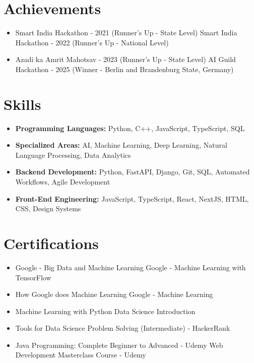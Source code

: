 \documentclass[a4paper,10pt]{article}
\begin{document}
\section*{Achievements}
\begin{itemize}
\item Smart India Hackathon - 2021 (Runner's Up - State Level) \hfill Smart India Hackathon - 2022 (Runner's Up - National Level)
\item Azadi ka Amrit Mahotsav - 2023 (Runner's Up - State Level) \hfill AI Guild Hackathon - 2025 (Winner - Berlin and Brandenburg State, Germany)
\end{itemize}

\section*{Skills}
\begin{itemize}
  \item \textbf{Programming Languages:} Python, C++, JavaScript, TypeScript, SQL
  \item \textbf{Specialized Areas:} AI, Machine Learning, Deep Learning, Natural Language Processing, Data Analytics
  \item \textbf{Backend Development:} Python, FastAPI, Django, Git, SQL, Automated Workflows, Agile Development
  \item \textbf{Front-End Engineering:} JavaScript, TypeScript, React, NextJS, HTML, CSS, Design Systems
\end{itemize}

\section*{Certifications}
\begin{itemize}
\item Google - Big Data and Machine Learning \hfill Google - Machine Learning with TensorFlow
\item How Google does Machine Learning \hfill Google - Machine Learning
\item Machine Learning with Python \hfill Data Science Introduction
\item Tools for Data Science \hfill Problem Solving (Intermediate) - HackerRank
\item Java Programming: Complete Beginner to Advanced - Udemy \hfill Web Development Masterclass Course - Udemy
\end{itemize}
\end{document}
